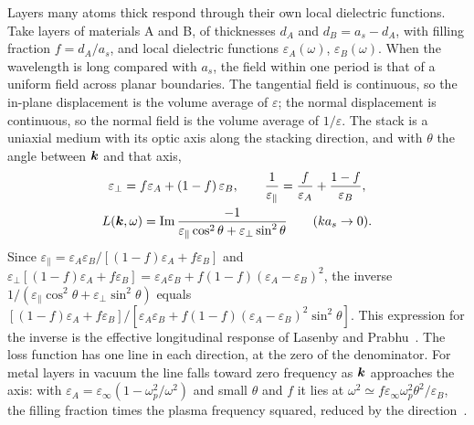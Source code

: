 Layers many atoms thick respond through their own local dielectric functions. Take layers of materials A and B, of thicknesses $d_A$ and $d_B = a_s - d_A$, with filling fraction $f = d_A/a_s$, and local dielectric functions $\varepsilon_A(\omega)$, $\varepsilon_B(\omega)$. When the wavelength is long compared with $a_s$, the field within one period is that of a uniform field across planar boundaries. The tangential field is continuous, so the in-plane displacement is the volume average of $\varepsilon$; the normal displacement is continuous, so the normal field is the volume average of $1/\varepsilon$. The stack is a uniaxial medium with its optic axis along the stacking direction, and with $\theta$ the angle between $\bm{k}$ and that axis,
\begin{gather}
  \varepsilon_\perp = f\varepsilon_A + (1 - f)\,\varepsilon_B , \qquad
  \frac{1}{\varepsilon_\parallel} = \frac{f}{\varepsilon_A} + \frac{1 - f}{\varepsilon_B} , \notag \\
  L(\bm{k},\omega) = \operatorname{Im}\frac{-1}{\varepsilon_\parallel\cos^2\theta + \varepsilon_\perp\sin^2\theta} \qquad (ka_s \to 0) .
  \label{eq:16.2-emt}
\end{gather}
Since $\varepsilon_\parallel = \varepsilon_A\varepsilon_B/[(1 - f)\varepsilon_A + f\varepsilon_B]$ and $\varepsilon_\perp[(1 - f)\varepsilon_A + f\varepsilon_B] = \varepsilon_A\varepsilon_B + f(1 - f)(\varepsilon_A - \varepsilon_B)^2$, the inverse $1/(\varepsilon_\parallel\cos^2\theta + \varepsilon_\perp\sin^2\theta)$ equals $[(1 - f)\varepsilon_A + f\varepsilon_B]/[\varepsilon_A\varepsilon_B + f(1 - f)(\varepsilon_A - \varepsilon_B)^2\sin^2\theta]$. This expression for the inverse is the effective longitudinal response of Lasenby and Prabhu~\cite[Eq.~(16)]{lasenby2022dark}. The loss function has one line in each direction, at the zero of the denominator. For metal layers in vacuum the line falls toward zero frequency as $\bm{k}$ approaches the axis: with $\varepsilon_A = \varepsilon_\infty(1 - \omega_p^2/\omega^2)$ and small $\theta$ and $f$ it lies at $\omega^2 \simeq f\varepsilon_\infty\omega_p^2\theta^2/\varepsilon_B$, the filling fraction times the plasma frequency squared, reduced by the direction~\cite{lasenby2022dark}.

